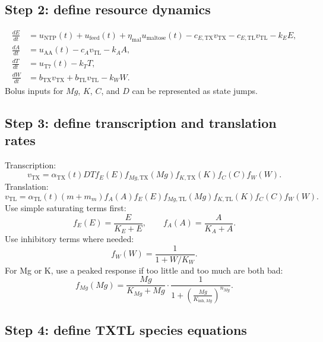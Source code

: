 \documentclass[11pt]{article}
\newcommand{\TX}{\mathrm{TX}}
\newcommand{\TL}{\mathrm{TL}}
\begin{document}
\subsection{Step 2: define resource dynamics}

\begin{align}
    \frac{dE}{dt} &= u_{\mathrm{NTP}}(t)+u_{\mathrm{feed}}(t)+\eta_{\mathrm{mal}}u_{\mathrm{maltose}}(t)
    -c_{E,\TX}v_{\TX}-c_{E,\TL}v_{\TL}-k_EE, \\
    \frac{dA}{dt} &= u_{\mathrm{AA}}(t)-c_Av_{\TL}-k_AA, \\
    \frac{dT}{dt} &= u_{\mathrm{T7}}(t)-k_TT, \\
    \frac{dW}{dt} &= b_{\TX}v_{\TX}+b_{\TL}v_{\TL}-k_WW.
\end{align}
Bolus inputs for $Mg$, $K$, $C$, and $D$ can be represented as state jumps.

\subsection{Step 3: define transcription and translation rates}

Transcription:
\begin{equation}
    v_{\TX}
    =
    \alpha_{\TX}(t)
    D T
    f_E(E)
    f_{Mg,\TX}(Mg)
    f_{K,\TX}(K)
    f_C(C)
    f_W(W).
\end{equation}
Translation:
\begin{equation}
    v_{\TL}
    =
    \alpha_{\TL}(t)
    (m+m_m)
    f_A(A)
    f_E(E)
    f_{Mg,\TL}(Mg)
    f_{K,\TL}(K)
    f_C(C)
    f_W(W).
\end{equation}
Use simple saturating terms first:
\begin{equation}
    f_E(E)=\frac{E}{K_E+E},
    \qquad
    f_A(A)=\frac{A}{K_A+A}.
\end{equation}
Use inhibitory terms where needed:
\begin{equation}
    f_W(W)=\frac{1}{1+W/K_W}.
\end{equation}
For Mg or K, use a peaked response if too little and too much are both bad:
\begin{equation}
    f_{Mg}(Mg)=
    \frac{Mg}{K_{Mg}+Mg}
    \cdot
    \frac{1}{1+\left(\frac{Mg}{K_{\mathrm{inh},Mg}}\right)^{n_{Mg}}}.
\end{equation}

\subsection{Step 4: define TXTL species equations}
\end{document}
